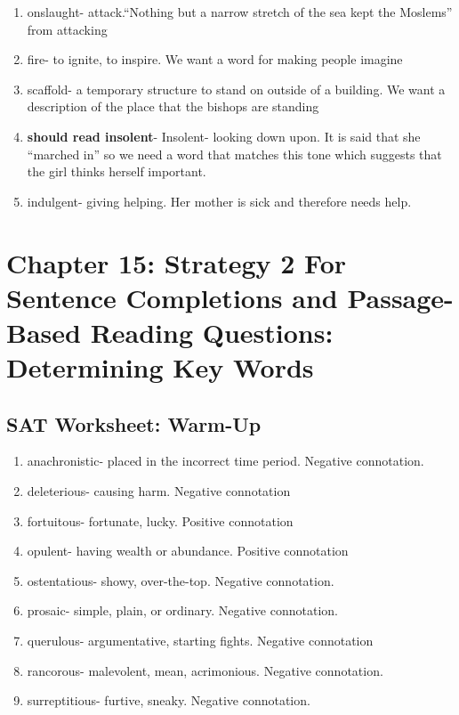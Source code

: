 \begin{enumerate}
\begin{enumerate}
\item onslaught- attack.``Nothing but a narrow stretch of the sea kept the Moslems'' from attacking
\item fire- to ignite, to inspire. We want a word for making people imagine
\item scaffold- a temporary structure to stand on outside of a building. We want a description of the place that the bishops are standing
\item \textbf{should read insolent}- Insolent- looking down upon. It is said that she ``marched in'' so we need a word that matches this tone which suggests that the girl thinks herself important. 
\item indulgent- giving helping. Her mother is sick and therefore needs help.
\end{enumerate}






\vfill
\newpage

\section{Chapter 15: Strategy 2 For Sentence Completions and Passage-Based Reading Questions:
Determining Key Words}

\subsection{SAT Worksheet: Warm-Up}
\begin{enumerate}
\item anachronistic- placed in the incorrect time period. Negative connotation.
\item deleterious- causing harm. Negative connotation
\item fortuitous- fortunate, lucky. Positive connotation
\item opulent- having wealth or abundance. Positive connotation
\item ostentatious- showy, over-the-top. Negative connotation.
\item prosaic- simple, plain, or ordinary. Negative connotation.
\item querulous- argumentative, starting fights. Negative connotation
\item rancorous- malevolent, mean, acrimonious. Negative connotation.
\item surreptitious- furtive, sneaky. Negative connotation. 
\end{enumerate}

\end{enumerate}
